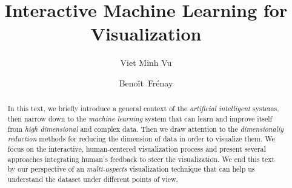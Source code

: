 \documentclass[sigconf,natbib=false]{acmart}
\begin{document}
\title{Interactive Machine Learning for Visualization}

\author{Viet Minh Vu}

\author{Beno\^it~Fr\'enay}

\renewcommand{\shortauthors}{V. M. Vu}

\begin{abstract}
In this text, we briefly introduce a general context of the \emph{artificial intelligent} systems, then narrow down to the \emph{machine learning} system that can learn and improve itself from \emph{high dimensional} and complex data. Then we draw attention to the \emph{dimensionaliy reduction} methods for reducing the dimension of data in order to visualize them. We focus on the interactive, human-centered visualization process and present several approaches integrating human's feedback to steer the visualization. We end this text by our perspective of an \emph{multi-aspects} visualization technique that can help us understand the dataset under different points of view.

\end{abstract}


\maketitle



\printbibliography
\end{document}

